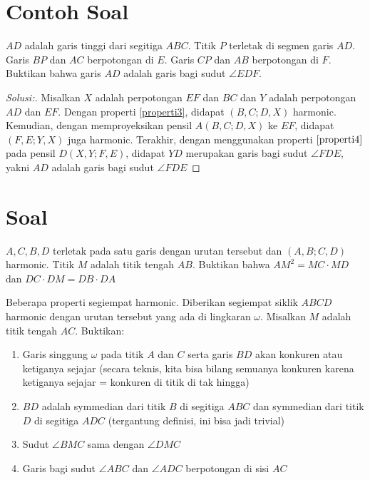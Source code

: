 \documentclass[11pt]{scrartcl}
\begin{document}
\section{Contoh Soal}
\begin{example}
    $AD$ adalah garis tinggi dari segitiga $ABC$. Titik $P$ terletak di segmen garis $AD$. Garis $BP$ dan $AC$ berpotongan di $E$. Garis $CP$ dan $AB$ berpotongan di $F$. Buktikan bahwa garis $AD$ adalah garis bagi sudut $\angle{EDF}$.
\end{example}

\begin{proof}[Solusi:]
    Misalkan $X$ adalah perpotongan $EF$ dan $BC$ dan $Y$ adalah perpotongan $AD$ dan $EF$. Dengan properti \ref{properti3}, didapat $(B, C; D, X)$ harmonic. Kemudian, dengan memproyeksikan pensil $A(B, C; D, X)$ ke $EF$, didapat $(F, E; Y, X)$ juga harmonic. Terakhir, dengan menggunakan properti $\ref{properti4}$ pada pensil $D(X, Y; F, E)$, didapat $YD$ merupakan garis bagi sudut $\angle{FDE}$, yakni $AD$ adalah garis bagi sudut $\angle{FDE}$
\end{proof}

\section{Soal}
\begin{problem}
    $A, C, B, D$ terletak pada satu garis dengan urutan tersebut dan $(A, B; C, D)$ harmonic. Titik $M$ adalah titik tengah $AB$. Buktikan bahwa $AM^2 = MC \cdot MD$ dan $DC\cdot DM = DB\cdot DA$
\end{problem}

\begin{problem}
    Beberapa properti segiempat harmonic. Diberikan segiempat siklik $ABCD$ harmonic dengan urutan tersebut yang ada di lingkaran $\omega$. Misalkan $M$ adalah titik tengah $AC$. Buktikan:
    \begin{enumerate}
        \item Garis singgung $\omega$ pada titik $A$ dan $C$ serta garis $BD$ akan konkuren atau ketiganya sejajar (secara teknis, kita bisa bilang semuanya konkuren karena ketiganya sejajar = konkuren di titik di tak hingga)
        \item $BD$ adalah symmedian dari titik $B$ di segitiga $ABC$ dan symmedian dari titik $D$ di segitiga $ADC$ (tergantung definisi, ini bisa jadi trivial)
        \item Sudut $\angle{BMC}$ sama dengan $\angle{DMC}$
        \item Garis bagi sudut $\angle{ABC}$ dan $\angle{ADC}$ berpotongan di sisi $AC$
    \end{enumerate}
\end{problem}
\end{document}

